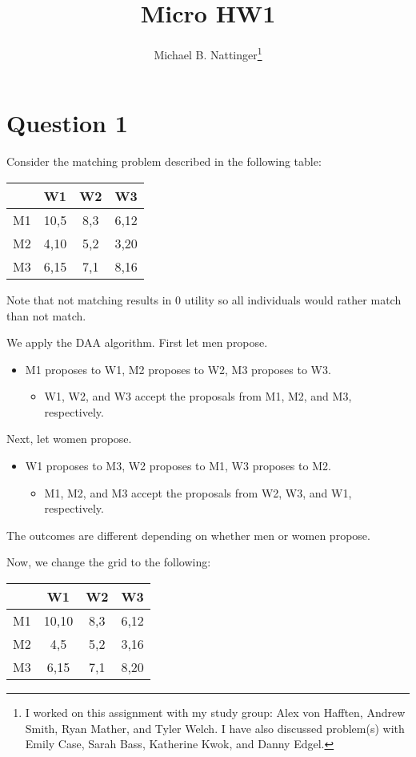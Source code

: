 \documentclass[11pt]{article} %
\title{Micro HW1}
\author{Michael B. Nattinger\footnote{I worked on this assignment with my study group: Alex von Hafften, Andrew Smith, Ryan Mather, and Tyler Welch. I have also discussed problem(s) with Emily Case, Sarah Bass, Katherine Kwok, and Danny Edgel.}}
\begin{document}
\maketitle

\section{Question 1}
Consider the matching problem described in the following table:

\begin{center}
\begin{tabular}{c|ccc}
 & W1 & W2 & W3\\
\hline
M1 & 10,5 & 8,3 & 6,12 \\
M2 & 4,10 & 5,2 & 3,20 \\
M3 & 6,15 & 7,1 & 8,16
\end{tabular}
\end{center}

Note that not matching results in $0$ utility so all individuals would rather match than not match.

We apply the DAA algorithm. First let men propose.
\begin{itemize}
\item M1 proposes to W1, M2 proposes to W2, M3 proposes to W3.
\begin{itemize}
\item W1, W2, and W3 accept the proposals from M1, M2, and M3, respectively.
\end{itemize}
\end{itemize}

Next, let women propose.
\begin{itemize}
\item W1 proposes to M3, W2 proposes to M1, W3 proposes to M2.
\begin{itemize}
\item M1, M2, and M3 accept the proposals from W2, W3, and W1, respectively.
\end{itemize}
\end{itemize}

The outcomes are different depending on whether men or women propose.

Now, we change the grid to the following:

\begin{center}
\begin{tabular}{c|ccc}
 & W1 & W2 & W3\\
\hline
M1 & 10,10 & 8,3 & 6,12 \\
M2 & 4,5 & 5,2 & 3,16 \\
M3 & 6,15 & 7,1 & 8,20
\end{tabular}
\end{center}
\end{document}
